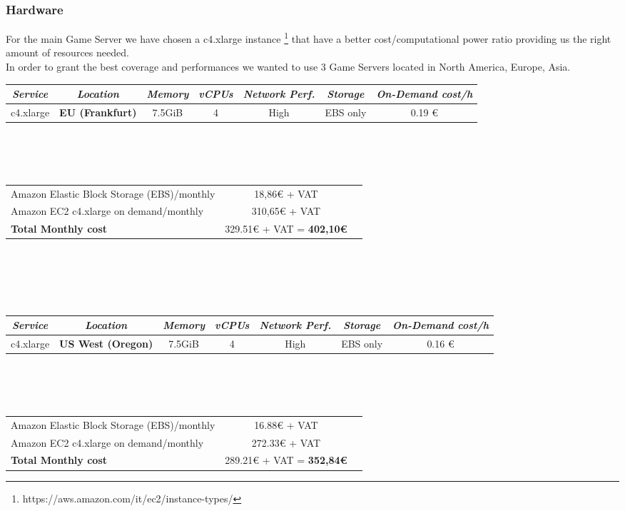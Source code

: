 \subsubsection{Hardware}
For the main Game Server we have chosen a c4.xlarge instance \footnote{https://aws.amazon.com/it/ec2/instance-types/} that have a better cost/computational power ratio providing us the right amount of resources needed.\\
In order to grant the best coverage and performances we wanted to use 3 Game Servers located in North America, Europe, Asia.
\\
\begin{tabular}{|c|c|c|c|c|c|c|}
\hline
\textit{Service} & \textit{Location} & \textit{Memory} & \textit{vCPUs} & \textit{Network Perf.} & \textit{Storage} & \textit{On-Demand cost/h}\\
\hline
c4.xlarge &	\textbf{EU (Frankfurt)} & 7.5GiB &	4 &	High & EBS only & 0.19 €\\
\hline
\end{tabular}
\\\\\\
\begin{tabular}{lcr}
Amazon Elastic Block Storage (EBS)/monthly  & 18,86€ + VAT \\
Amazon EC2 c4.xlarge on demand/monthly & 310,65€ + VAT \\
\hline
\textbf{Total Monthly cost} & 329.51€ + VAT = \textbf{402,10€}
\end{tabular}
\\
\\\\\\
\begin{tabular}{|c|c|c|c|c|c|c|}
\hline
\textit{Service} & \textit{Location} & \textit{Memory} & \textit{vCPUs} & \textit{Network Perf.} & \textit{Storage} & \textit{On-Demand cost/h}\\
\hline
c4.xlarge &	\textbf{US West (Oregon)} & 7.5GiB &	4 &	High & EBS only & 0.16 €\\
\hline
\end{tabular}
\\\\\\
\begin{tabular}{lcr}
Amazon Elastic Block Storage (EBS)/monthly  & 16.88€ + VAT \\
Amazon EC2 c4.xlarge on demand/monthly & 272.33€ + VAT \\
\hline
\textbf{Total Monthly cost} & 289.21€ + VAT = \textbf{352,84€}
\end{tabular}
